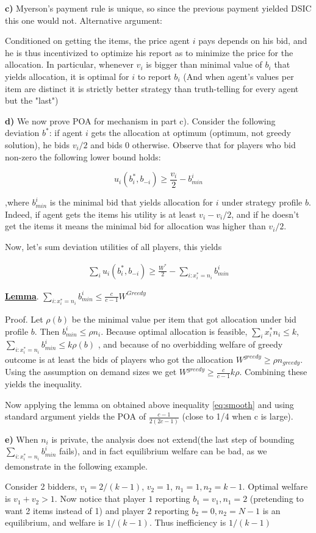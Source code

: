 \textbf{c)} Myerson's payment rule is unique, so since the previous payment yielded DSIC this one would not. Alternative argument:

Conditioned on getting the items, the price agent $i$ pays depends on his bid, and he is thus incentivized to optimize his report as to minimize the price for the allocation. In particular, whenever $v_i$ is bigger than minimal value of $b_i$ that yields allocation, it is optimal for $i$ to report $b_i$ (And when agent's values per item are distinct it is strictly better strategy than truth-telling for every agent but the "last")

\textbf{d)} We now prove POA for mechanism in part c). Consider the following deviation $b^*$: if agent $i$ gets the allocation at optimum (optimum, not greedy solution), he bids $v_i/2$ and bids 0 otherwise. Observe that for players who bid non-zero the following lower bound holds:

$$
u_i(b^*_i,b_{-i})\geq \frac{v_i}{2}-b^i_{min}
$$

,where $b^i_{min}$ is the minimal bid that yields allocation for $i$ under strategy profile $b$. Indeed, if agent gets the items his utility is at least $v_i-v_i/2$, and if he doesn't get the items it means the minimal bid for allocation was higher than $v_i/2$.

Now, let's sum deviation utilities of all players, this yields

\begin{align}
\label{eq:smooth}
\sum_i u_i(b_i^*,b_{-i})\geq \frac{W^*}{2}-\sum_{i: x^*_i=n_i} b^i_{min}
\end{align}

\textbf{\uline{Lemma}}. $\sum_{i: x^*_i=n_i} b^i_{min} \leq \frac{c}{c-1}W^{Greedy}$

Proof. Let $\rho(b)$ be the minimal value per item that got allocation under bid profile $b$. Then $b^i_{min}\leq \rho n_i$. Because optimal allocation is feasible, $\sum_i x^*_i n_i \leq k$, $\sum_{i: x^*_i=n_i} b^i_{min} \leq k\rho(b)$ , and because of no overbidding welfare of greedy outcome is at least the bids of players who got the allocation $W^{greedy} \geq \rho n_{greedy}$. Using the assumption on demand sizes we get $W^{greedy}\geq \frac{c}{c-1}k\rho$. Combining these yields the inequality.
\bigskip

Now applying the lemma on obtained above inequality \eqref{eq:smooth} and using standard argument yields the POA of $\frac{c-1}{2(2c-1)}$ (close to 1/4 when c is large).


\textbf{e)} When $n_i$ is private, the analysis does not extend(the last step of bounding  $\sum_{i: x^*_i=n_i} b^i_{min}$ fails), and in fact equilibrium welfare can be bad, as we demonstrate in the following example.

Consider 2 bidders, $v_1=2/(k-1)$, $v_2=1$, $n_1=1,n_2=k-1$. Optimal welfare is $v_1+v_2>1$. Now notice that player $1$ reporting $b_1=v_1,n_1=2$ (pretending to want 2 items instead of 1) and player $2$ reporting $b_2=0, n_2=N-1$ is an equilibrium, and welfare is $1/(k-1)$. Thus inefficiency is $1/(k-1)$